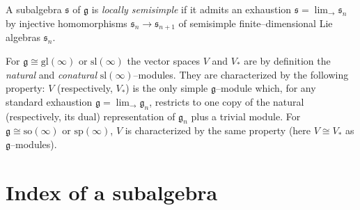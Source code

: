 \documentclass[oneside,leqno,12pt]{article}
\def\gg{\mathfrak{g}}
\renewcommand{\ss}{\mathfrak{s}}
\renewcommand{\gg}{\mathfrak{g}}
\renewcommand{\sp}{\mathrm{sp}}
\newcommand{\gl}{\mathrm{gl}}
\renewcommand{\sl}{\mathrm{sl}}
\newcommand{\so}{\mathrm{so}}
\begin{document}
A subalgebra $\ss$ of $\gg$ is \emph{locally semisimple} if it admits an exhaustion $\displaystyle\ss=\lim_\to\ss_n$ by injective homomorphisms $\ss_n\to\ss_{n+1}$ of semisimple finite--dimensional Lie algebras $\ss_n$.

For $\gg\cong \gl(\infty)$ or $\sl(\infty)$  the vector spaces $V$ and $V_*$ are by definition the \emph{natural} and \emph{conatural} $\sl(\infty)$--modules. They are characterized by the following property: $V$ (respectively, $V_*$) is the only simple $\gg$--module which, for any standard exhaustion $\displaystyle\gg=\lim_\to \gg_n$, restricts to one copy of the natural (respectively, its dual) representation of $\gg_n$ plus a trivial module. For $\gg \cong \so(\infty)$ or $\sp(\infty)$, $V$ is characterized by the same property (here $V\cong V_*$  as $\gg$--modules). 

\section{Index of a subalgebra}
\end{document}
